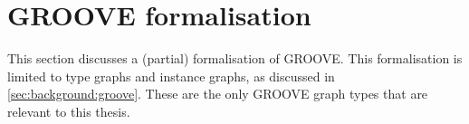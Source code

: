 \section{GROOVE formalisation}
\label{sec:formalisations:groove_formalisation}

This section discusses a (partial) formalisation of GROOVE. This formalisation is limited to type graphs and instance graphs, as discussed in \cref{sec:background:groove}. These are the only GROOVE graph types that are relevant to this thesis.




